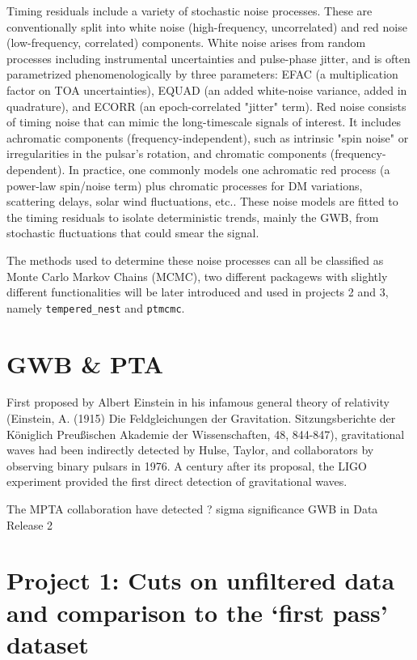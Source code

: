 \documentclass[12pt,a4paper]{article}
\begin{document}
Timing residuals include a variety of stochastic noise processes. These are conventionally split into white noise (high-frequency, uncorrelated) and red noise (low-frequency, correlated) components. White noise arises from random processes including instrumental uncertainties and pulse-phase jitter, and is often parametrized phenomenologically by three parameters: EFAC (a multiplication factor on TOA uncertainties), EQUAD (an added white-noise variance, added in quadrature), and ECORR (an epoch-correlated "jitter" term). Red noise consists of timing noise that can mimic the long-timescale signals of interest. It includes achromatic components (frequency-independent), such as intrinsic "spin noise" or irregularities in the pulsar's rotation, and chromatic components (frequency-dependent). In practice, one commonly models one achromatic red process (a power-law spin/noise term) plus chromatic processes for DM variations, scattering delays, solar wind fluctuations, etc.. These noise models are fitted to the timing residuals to isolate deterministic trends, mainly the GWB, from stochastic fluctuations that could smear the signal.

The methods used to determine these noise processes can all be classified as Monte Carlo Markov Chains (MCMC), two different packagews with slightly different functionalities will be later introduced and used in projects 2 and 3, namely \texttt{tempered\_nest} and \texttt{ptmcmc}.

\section{GWB \& PTA}

First proposed by Albert Einstein in his infamous general theory of relativity (Einstein, A. (1915) Die Feldgleichungen der Gravitation. Sitzungsberichte der Königlich Preu\ss ischen Akademie der Wissenschaften, 48, 844-847), gravitational waves had been indirectly detected by Hulse, Taylor, and collaborators by observing binary pulsars in 1976. A century after its proposal, the LIGO experiment provided the first direct detection of gravitational waves. 

The MPTA collaboration have detected ? sigma significance GWB in Data Release 2

\newpage

\section{Project 1: Cuts on unfiltered data and comparison to the `first pass' dataset}
\end{document}
